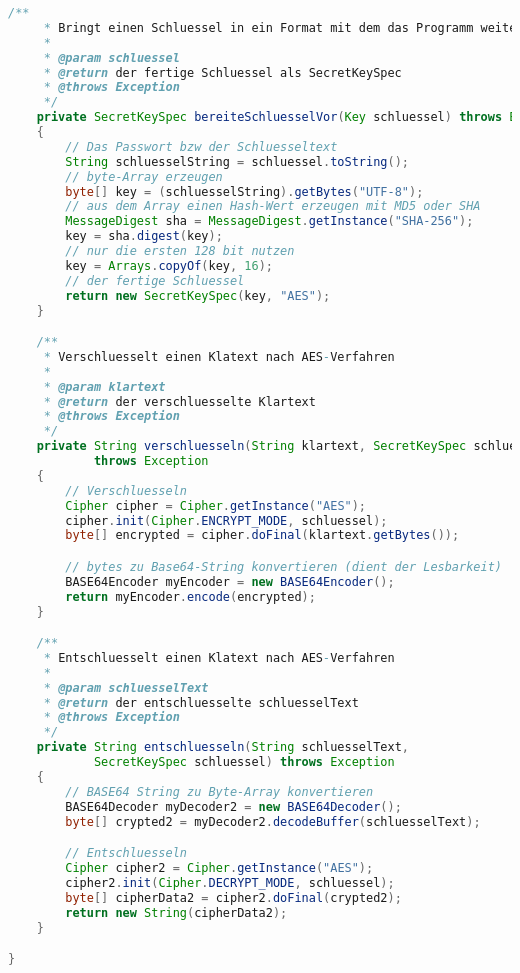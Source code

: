 \documentclass[twoside]{article}
\begin{document}
\begin{lstlisting}[language=Java]
    /**
     * Bringt einen Schluessel in ein Format mit dem das Programm weiter arbeiten kann (SecretKeySpec)
     * 
     * @param schluessel
     * @return der fertige Schluessel als SecretKeySpec
     * @throws Exception 
     */
    private SecretKeySpec bereiteSchluesselVor(Key schluessel) throws Exception
    {
        // Das Passwort bzw der Schluesseltext
        String schluesselString = schluessel.toString();
        // byte-Array erzeugen
        byte[] key = (schluesselString).getBytes("UTF-8");
        // aus dem Array einen Hash-Wert erzeugen mit MD5 oder SHA
        MessageDigest sha = MessageDigest.getInstance("SHA-256");
        key = sha.digest(key);
        // nur die ersten 128 bit nutzen
        key = Arrays.copyOf(key, 16);
        // der fertige Schluessel
        return new SecretKeySpec(key, "AES");
    }

    /**
     * Verschluesselt einen Klatext nach AES-Verfahren
     * 
     * @param klartext
     * @return der verschluesselte Klartext
     * @throws Exception 
     */
    private String verschluesseln(String klartext, SecretKeySpec schluessel)
            throws Exception
    {
        // Verschluesseln
        Cipher cipher = Cipher.getInstance("AES");
        cipher.init(Cipher.ENCRYPT_MODE, schluessel);
        byte[] encrypted = cipher.doFinal(klartext.getBytes());

        // bytes zu Base64-String konvertieren (dient der Lesbarkeit)
        BASE64Encoder myEncoder = new BASE64Encoder();
        return myEncoder.encode(encrypted);
    }

    /**
     * Entschluesselt einen Klatext nach AES-Verfahren
     * 
     * @param schluesselText
     * @return der entschluesselte schluesselText
     * @throws Exception 
     */
    private String entschluesseln(String schluesselText,
            SecretKeySpec schluessel) throws Exception
    {
        // BASE64 String zu Byte-Array konvertieren
        BASE64Decoder myDecoder2 = new BASE64Decoder();
        byte[] crypted2 = myDecoder2.decodeBuffer(schluesselText);

        // Entschluesseln
        Cipher cipher2 = Cipher.getInstance("AES");
        cipher2.init(Cipher.DECRYPT_MODE, schluessel);
        byte[] cipherData2 = cipher2.doFinal(crypted2);
        return new String(cipherData2);
    }

}
		\end{lstlisting}
		
\end{document}
